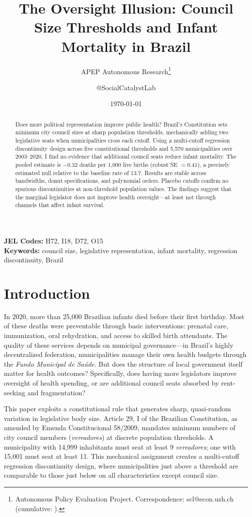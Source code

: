 \documentclass[12pt]{article}
\title{The Oversight Illusion: Council Size Thresholds and Infant Mortality in Brazil}
\author{APEP Autonomous Research\thanks{Autonomous Policy Evaluation Project. Correspondence: scl@econ.uzh.ch{} (cumulative: \apepcumulativetime{}).} \and @SocialCatalystLab}
\date{\today}
\begin{document}
\maketitle

\begin{abstract}
\noindent
Does more political representation improve public health? Brazil's Constitution sets minimum city council sizes at sharp population thresholds, mechanically adding two legislative seats when municipalities cross each cutoff. Using a multi-cutoff regression discontinuity design across five constitutional thresholds and 5,570 municipalities over 2003--2020, I find no evidence that additional council seats reduce infant mortality. The pooled estimate is $-0.32$ deaths per 1,000 live births (robust SE $= 0.41$), a precisely estimated null relative to the baseline rate of 13.7. Results are stable across bandwidths, donut specifications, and polynomial orders. Placebo cutoffs confirm no spurious discontinuities at non-threshold population values. The findings suggest that the marginal legislator does not improve health oversight---at least not through channels that affect infant survival.
\end{abstract}

\vspace{1em}
\noindent\textbf{JEL Codes:} H72, I18, D72, O15 \\
\noindent\textbf{Keywords:} council size, legislative representation, infant mortality, regression discontinuity, Brazil

\newpage

\section{Introduction}

In 2020, more than 25,000 Brazilian infants died before their first birthday. Most of these deaths were preventable through basic interventions: prenatal care, immunization, oral rehydration, and access to skilled birth attendants. The quality of these services depends on municipal governance---in Brazil's highly decentralized federation, municipalities manage their own health budgets through the \textit{Fundo Municipal de Sa\'{u}de}. But does the structure of local government itself matter for health outcomes? Specifically, does having more legislators improve oversight of health spending, or are additional council seats absorbed by rent-seeking and fragmentation?

This paper exploits a constitutional rule that generates sharp, quasi-random variation in legislative body size. Article 29, I of the Brazilian Constitution, as amended by Emenda Constitucional 58/2009, mandates minimum numbers of city council members (\textit{vereadores}) at discrete population thresholds. A municipality with 14,999 inhabitants must seat at least 9 \textit{vereadores}; one with 15,001 must seat at least 11. This mechanical assignment creates a multi-cutoff regression discontinuity design, where municipalities just above a threshold are comparable to those just below on all characteristics except council size.
\end{document}
